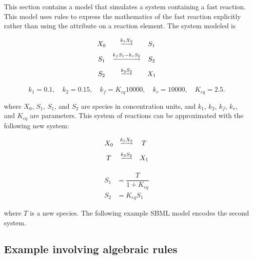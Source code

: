 This section contains a model that simulates a system containing a
fast reaction.  This model uses rules to express the mathematics
of the fast reaction explicitly rather than using the 
attribute on a reaction element.  The system modeled is
\begin{linenomath}
\begin{equation*}
  \begin{array}{@{}ccc@{}}
    X_0 & \overset{\underrightarrow{k_1 X_0}}{}           & S_1 \\[6pt]
    S_1 & \overset{\underrightarrow{k_f S_1 - k_r S_2}}{} & S_2 \\[6pt]
    S_2 & \overset{\underrightarrow{k_2 S_2}}{}           & X_1 \\[6pt]
  \end{array}
\end{equation*}
\begin{equation*}
    k_1 = 0.1, \quad k_2 = 0.15, \quad k_f = K_{eq} 10000, \quad k_r = 10000, \quad K_{eq} = 2.5.
\end{equation*}
\end{linenomath}
where $X_0$, $S_1$, $S_1$, and $S_2$ are species in concentration units,
and $k_1$, $k_2$, $k_f$, $k_r$, and $K_{eq}$ are parameters.  This
system of reactions can be approximated with the following new
system:
\begin{linenomath}
\begin{equation*}
  \begin{array}{@{}ccc@{}}
    X_0 & \overset{\underrightarrow{k_1 X_0}}{} & T \\[6pt]
    T & \overset{\underrightarrow{k_2 S_2}}{} & X_1\\[6pt]
  \end{array}
\end{equation*}
\begin{equation*}
\begin{aligned}
    S_1 &= \dfrac{T}{1 + K_{eq}} \\[6pt]
    S_2 &= K_{eq} S_1
  \end{aligned}
\end{equation*}
\end{linenomath}

where $T$ is a new species.  The following example SBML model
encodes the second system.



\subsection{Example involving algebraic rules}
\label{sec:algeraiceg}

